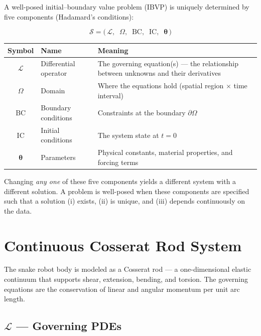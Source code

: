 \documentclass[11pt]{article}
\begin{document}
A well-posed initial--boundary value problem (IBVP) is uniquely determined by five components (Hadamard's conditions):

\begin{equation}
  \boxed{\;\mathcal{S} = \bigl(\,\mathcal{L},\;\; \Omega,\;\; \text{BC},\;\; \text{IC},\;\; \bm{\theta}\,\bigr)\;}
  \label{eq:system-tuple}
\end{equation}

\begin{table}[H]
  \centering
  \begin{tabular}{clp{8.5cm}}
    \toprule
    Symbol & Name & Meaning \\
    \midrule
    $\mathcal{L}$ & Differential operator & The governing equation(s) --- the relationship between unknowns and their derivatives \\
    $\Omega$ & Domain & Where the equations hold (spatial region $\times$ time interval) \\
    BC & Boundary conditions & Constraints at the boundary $\partial\Omega$ \\
    IC & Initial conditions & The system state at $t = 0$ \\
    $\bm{\theta}$ & Parameters & Physical constants, material properties, and forcing terms \\
    \bottomrule
  \end{tabular}
\end{table}

\noindent
Changing \emph{any one} of these five components yields a different system with a different solution.
A problem is well-posed when these components are specified such that a solution (i) exists, (ii) is unique, and (iii) depends continuously on the data.

\section{Continuous Cosserat Rod System}
\label{sec:continuous}

The snake robot body is modeled as a Cosserat rod --- a one-dimensional elastic continuum that supports shear, extension, bending, and torsion.
The governing equations are the conservation of linear and angular momentum per unit arc length.

\subsection{\texorpdfstring{$\mathcal{L}$}{L} --- Governing PDEs}
\label{sec:L}
\end{document}

